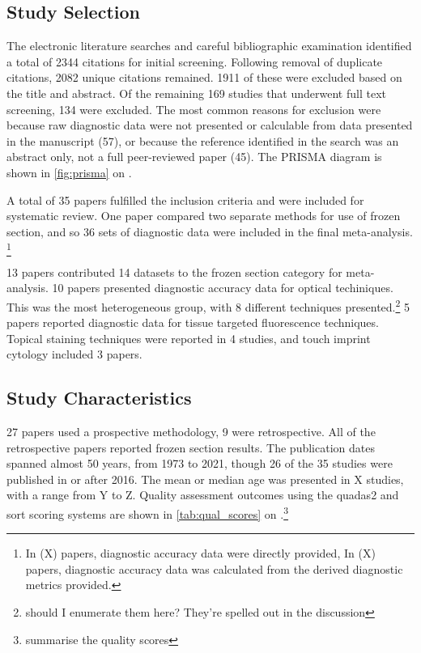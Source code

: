 \subsection{Study Selection}

The electronic literature searches and careful bibliographic examination identified a total of 2344 citations for initial screening.
Following removal of duplicate citations, 2082 unique citations remained.
1911 of these were excluded based on the title and abstract.
Of the remaining 169 studies that underwent full text screening, 134 were excluded.
The most common reasons for exclusion were because raw diagnostic data were not presented or calculable from data presented in the manuscript (57), or because the reference identified in the search was an abstract only, not a full peer-reviewed paper (45).
The PRISMA diagram is shown in \cref{fig:prisma} on .

A total of 35 papers fulfilled the inclusion criteria and were included for systematic review.
One paper \cite{amitImprovingRateNegative2016} compared two separate methods for use of frozen section, and so 36 sets of diagnostic data were included in the final meta-analysis.
\footnote{In (X) papers, diagnostic accuracy data were directly provided, In (X) papers, diagnostic accuracy data was calculated from the derived diagnostic metrics provided.}

13 papers contributed 14 datasets to the frozen section category for meta-analysis.
10 papers presented diagnostic accuracy data for optical techiniques.
This was the most heterogeneous group, with 8 different techniques presented.\footnote{should I enumerate them here? They're spelled out in the discussion}
5 papers reported diagnostic data for tissue targeted fluorescence techniques.
Topical staining techniques were reported in 4 studies, and touch imprint cytology included 3 papers.

\subsection{Study Characteristics}
27 papers used a prospective methodology, 9 were retrospective.
All of the retrospective papers reported frozen section results.
The publication dates spanned almost 50 years, from 1973 to 2021, though 26 of the 35 studies were published in or after 2016.
The mean or median age was presented in X studies, with a range from Y to Z.
Quality assessment outcomes using the \gls{quadas2} and \gls{sort} scoring systems are shown in \cref{tab:qual_scores} on .\footnote{summarise the quality scores}


